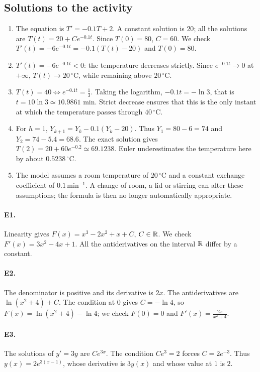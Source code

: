 \subsection{Solutions to the activity}\begin{enumerate}
\item The equation is $T'=-0.1T+2$. A constant solution is $20$; all the solutions are $T(t)=20+Ce^{-0.1t}$. Since $T(0)=80$, $C=60$. We check $T'(t)=-6e^{-0.1t}=-0.1(T(t)-20)$ and $T(0)=80$.
\item $T'(t)=-6e^{-0.1t}<0$: the temperature decreases strictly. Since $e^{-0.1t}\to0$ at $+\infty$, $T(t)\to20\,^{\circ}\mathrm C$, while remaining above $20\,^{\circ}\mathrm C$.
\item $T(t)=40\Longleftrightarrow e^{-0.1t}=\frac{1}{3}$. Taking the logarithm, $-0.1t=-\ln3$, that is $t=10\ln3\simeq10.9861$ min. Strict decrease ensures that this is the only instant at which the temperature passes through $40\,^{\circ}\mathrm C$.
\item For $h=1$, $Y_{k+1}=Y_k-0.1(Y_k-20)$. Thus $Y_1=80-6=74$ and $Y_2=74-5.4=68.6$. The exact solution gives $T(2)=20+60e^{-0.2}\simeq69.1238$. Euler underestimates the temperature here by about $0.5238\,^{\circ}\mathrm C$.
\item The model assumes a room temperature of $20\,^{\circ}\mathrm C$ and a constant exchange coefficient of $0.1\,\mathrm{min}^{-1}$. A change of room, a lid or stirring can alter these assumptions; the formula is then no longer automatically appropriate.
\end{enumerate}

\paragraph{E1.}Linearity gives $F(x)=x^3-2x^2+x+C$, $C\in\mathbb R$. We check $F'(x)=3x^2-4x+1$. All the antiderivatives on the interval $\mathbb R$ differ by a constant.

\paragraph{E2.}The denominator is positive and its derivative is $2x$. The antiderivatives are $\ln(x^2+4)+C$. The condition at $0$ gives $C=-\ln4$, so $F(x)=\ln(x^2+4)-\ln4$; we check $F(0)=0$ and $F'(x)=\frac{2x}{x^2+4}$.

\paragraph{E3.}The solutions of $y'=3y$ are $Ce^{3x}$. The condition $Ce^3=2$ forces $C=2e^{-3}$. Thus $y(x)=2e^{3(x-1)}$, whose derivative is $3y(x)$ and whose value at $1$ is $2$.

